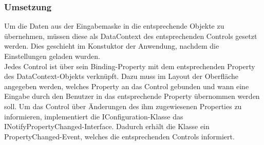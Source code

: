 \subsubsection{Umsetzung}
Um die Daten aus der Eingabemaske in die entsprechende Objekte zu übernehmen, müssen diese als DataContext des entsprechenden Controls gesetzt werden. Dies geschieht im Konstuktor der Anwendung, nachdem die Einstellungen geladen wurden.\\
Jedes Control ist über sein Binding-Property mit dem entsprechenden Property des DataContext-Objekts verknüpft. Dazu muss im Layout der Oberfläche angegeben werden, welches Property an das Control gebunden und wann eine Eingabe durch den Benutzer in das entsprechende Property übernommen werden soll. Um das Control über Änderungen des ihm zugewiesenen Properties zu informieren, implementiert die IConfiguration-Klasse das INotifyPropertyChanged-Interface. Dadurch erhält die Klasse ein PropertyChanged-Event, welches die entsprechenden Controls informiert. \\

